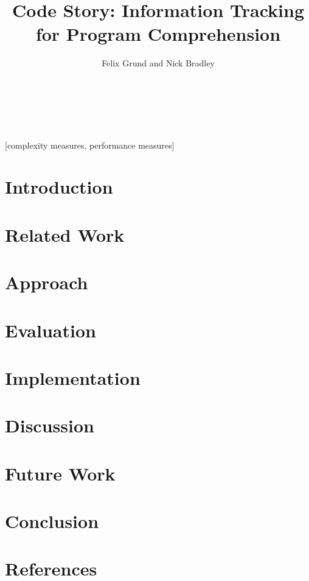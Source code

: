 \documentclass{sig-alternate}
\begin{document}
\title{Code Story: Information Tracking for Program Comprehension}

\author{
\alignauthor
Felix Grund and Nick Bradley \\
       \\
       \\
       \\
}
\maketitle


\begin{abstract}
  
\end{abstract}

[complexity measures, performance measures]



\section{Introduction}
  
\section{Related Work}
  
\section{Approach}
  
\section{Evaluation}
  
\section{Implementation}
  
\section{Discussion}
  
\section{Future Work}
  
\section{Conclusion}
  
\section{References}
\end{document}
